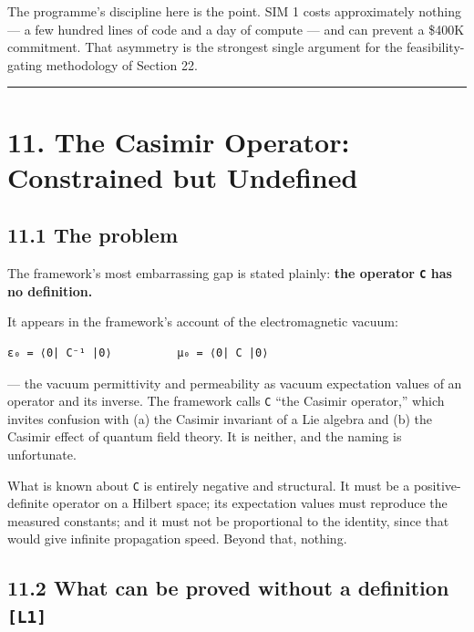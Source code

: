 \documentclass[
  11pt]{report}
\begin{document}
The programme's discipline here is the point. SIM 1 costs approximately
nothing --- a few hundred lines of code and a day of compute --- and can
prevent a \$400K commitment. That asymmetry is the strongest single
argument for the feasibility-gating methodology of Section 22.

\begin{center}\rule{0.5\linewidth}{0.5pt}\end{center}

\hypertarget{the-casimir-operator-constrained-but-undefined}{%
\chapter{11. The Casimir Operator: Constrained but
Undefined}\label{the-casimir-operator-constrained-but-undefined}}

\hypertarget{the-problem}{%
\section{11.1 The problem}\label{the-problem}}

The framework's most embarrassing gap is stated plainly: \textbf{the
operator \texttt{C} has no definition.}

It appears in the framework's account of the electromagnetic vacuum:

\begin{verbatim}
ε₀ = ⟨0| C⁻¹ |0⟩          μ₀ = ⟨0| C |0⟩
\end{verbatim}

--- the vacuum permittivity and permeability as vacuum expectation
values of an operator and its inverse. The framework calls \texttt{C}
``the Casimir operator,'' which invites confusion with (a) the Casimir
invariant of a Lie algebra and (b) the Casimir effect of quantum field
theory. It is neither, and the naming is unfortunate.

What is known about \texttt{C} is entirely negative and structural. It
must be a positive-definite operator on a Hilbert space; its expectation
values must reproduce the measured constants; and it must not be
proportional to the identity, since that would give infinite propagation
speed. Beyond that, nothing.

\hypertarget{what-can-be-proved-without-a-definition-l1}{%
\section{\texorpdfstring{11.2 What can be proved without a definition
\texttt{{[}L1{]}}}{11.2 What can be proved without a definition {[}L1{]}}}\label{what-can-be-proved-without-a-definition-l1}}
\end{document}
